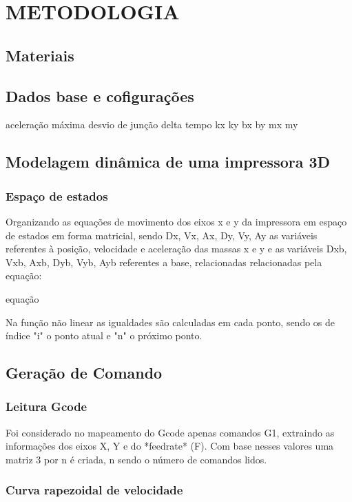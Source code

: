 \chapter{METODOLOGIA}

\section{Materiais}

\section{Dados base e cofigurações}

aceleração máxima
desvio de junção
delta tempo
kx
ky
bx
by
mx
my


\section{Modelagem dinâmica de uma impressora 3D}


\subsection{Espaço de estados}
Organizando as equações de movimento dos eixos x e y da 
impressora em espaço de estados em forma matricial, sendo 
Dx, Vx, Ax, Dy, Vy, Ay as variáveis referentes à posição,
velocidade e aceleração das massas x e y e as variáveis Dxb, 
Vxb, Axb, Dyb, Vyb, Ayb referentes a base, relacionadas 
relacionadas pela equação:

equação

Na função não linear as igualdades são calculadas em cada ponto, 
sendo os de índice "i" o ponto atual e "n" o próximo ponto.

\section{Geração de Comando}

\subsection{Leitura Gcode}

Foi considerado no mapeamento do Gcode apenas comandos G1, extraindo
as informações dos eixos X, Y e do *feedrate* (F). Com base nesses valores
uma matriz 3 por n é criada, n sendo o número de comandos lidos.

\subsection{Curva rapezoidal de velocidade}

